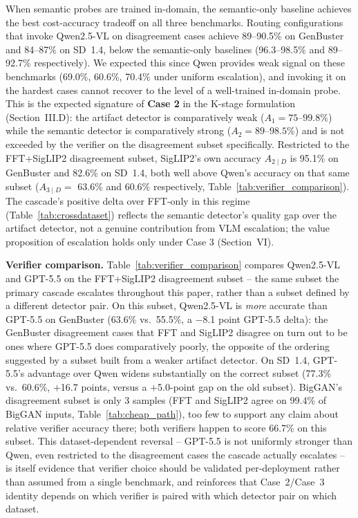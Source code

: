 \documentclass{ieeeaccess}
\begin{document}
When semantic probes are trained in-domain, the semantic-only baseline achieves the best
cost-accuracy tradeoff on all three benchmarks. Routing configurations that invoke
Qwen2.5-VL on disagreement cases achieve 89--90.5\% on GenBuster and 84--87\% on SD~1.4,
below the semantic-only baselines (96.3--98.5\% and 89--92.7\% respectively). We expected this since
Qwen provides weak signal on these benchmarks (69.0\%, 60.6\%, 70.4\% under
uniform escalation), and invoking it on the hardest cases cannot recover to the level of a
well-trained in-domain probe. This is the expected signature of \textbf{Case 2} in the
K-stage formulation (Section~III.D): the artifact detector is comparatively weak
($A_1 = 75$--$99.8\%$) while the semantic detector is comparatively strong
($A_2 = 89$--$98.5\%$) and is not exceeded by the verifier on the disagreement subset
specifically. Restricted to the FFT+SigLIP2 disagreement subset, SigLIP2's own accuracy
$A_{2\mid D}$ is 95.1\% on GenBuster and 82.6\% on SD~1.4, both well above Qwen's accuracy
on that same subset ($A_{3\mid D}=$ 63.6\% and 60.6\% respectively, Table~\ref{tab:verifier_comparison}).
The cascade's positive delta over FFT-only in this regime
(Table~\ref{tab:crossdataset}) reflects the semantic detector's quality gap over the
artifact detector, not a genuine contribution from VLM escalation; the value
proposition of escalation holds only under Case 3 (Section~VI).

\textbf{Verifier comparison.} Table~\ref{tab:verifier_comparison} compares Qwen2.5-VL
and GPT-5.5 on the FFT+SigLIP2 disagreement subset -- the same subset the primary
cascade escalates throughout this paper, rather than a subset defined by a different
detector pair. On this subset, Qwen2.5-VL is \emph{more} accurate than GPT-5.5 on
GenBuster (63.6\% vs.\ 55.5\%, a $-$8.1 point GPT-5.5 delta): the GenBuster disagreement
cases that FFT and SigLIP2 disagree on turn out to be ones where GPT-5.5 does
comparatively poorly, the opposite of the ordering suggested by a subset built from a
weaker artifact detector. On SD~1.4, GPT-5.5's advantage over Qwen widens substantially
on the correct subset (77.3\% vs.\ 60.6\%, $+$16.7 points, versus a $+$5.0-point gap on
the old subset). BigGAN's disagreement subset is only 3 samples (FFT and SigLIP2 agree
on 99.4\% of BigGAN inputs, Table~\ref{tab:cheap_path}), too few to support any claim
about relative verifier accuracy there; both verifiers happen to score 66.7\% on this
subset. This dataset-dependent reversal -- GPT-5.5 is not uniformly stronger than Qwen,
even restricted to the disagreement cases the cascade actually escalates -- is itself
evidence that verifier choice should be validated per-deployment rather than assumed
from a single benchmark, and reinforces that Case~2/Case~3 identity depends on which
verifier is paired with which detector pair on which dataset.
\end{document}
